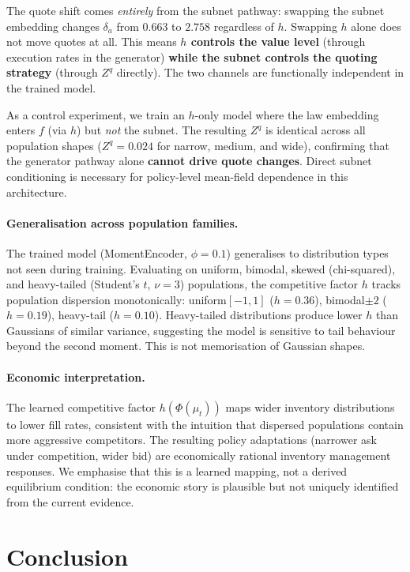 \documentclass[11pt,a4paper]{article}
\newcommand{\mup}{\mu_t}
\begin{document}
The quote shift comes \emph{entirely} from the subnet pathway: swapping the subnet embedding changes $\delta_a$ from $0.663$ to $2.758$ regardless of $h$. Swapping $h$ alone does not move quotes at all. This means \textbf{$h$ controls the value level} (through execution rates in the generator) \textbf{while the subnet controls the quoting strategy} (through $Z^q$ directly). The two channels are functionally independent in the trained model.

As a control experiment, we train an $h$-only model where the law embedding enters $f$ (via $h$) but \emph{not} the subnet. The resulting $Z^q$ is identical across all population shapes ($Z^q = 0.024$ for narrow, medium, and wide), confirming that the generator pathway alone \textbf{cannot drive quote changes}. Direct subnet conditioning is necessary for policy-level mean-field dependence in this architecture.

\paragraph{Generalisation across population families.}
The trained model (MomentEncoder, $\phi = 0.1$) generalises to distribution types not seen during training. Evaluating on uniform, bimodal, skewed (chi-squared), and heavy-tailed (Student's $t$, $\nu=3$) populations, the competitive factor $h$ tracks population dispersion monotonically: uniform$[-1,1]$ ($h = 0.36$), bimodal$\pm 2$ ($h = 0.19$), heavy-tail ($h = 0.10$). Heavy-tailed distributions produce lower $h$ than Gaussians of similar variance, suggesting the model is sensitive to tail behaviour beyond the second moment. This is not memorisation of Gaussian shapes.

\paragraph{Economic interpretation.}
The learned competitive factor $h(\Phi(\mup))$ maps wider inventory distributions to lower fill rates, consistent with the intuition that dispersed populations contain more aggressive competitors. The resulting policy adaptations (narrower ask under competition, wider bid) are economically rational inventory management responses. We emphasise that this is a learned mapping, not a derived equilibrium condition: the economic story is plausible but not uniquely identified from the current evidence.

\section{Conclusion}
\label{sec:conclusion}
\end{document}

